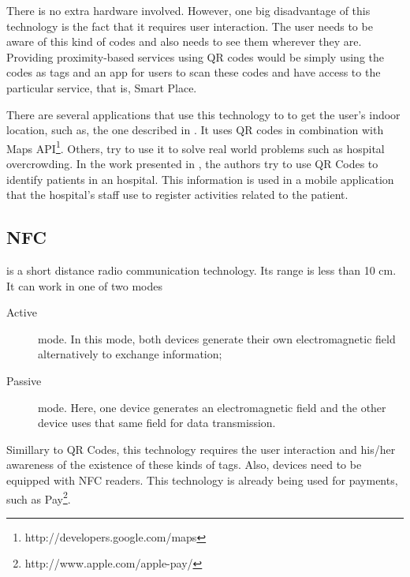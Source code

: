 There is no extra hardware involved.
However, one big disadvantage of this technology is the fact that it requires user interaction.
The user needs to be aware of this kind of codes and also needs to see them wherever they are.
Providing proximity-based services using \gls{QR} codes would be simply using the codes as tags and an app for users to scan these codes and have access to the particular service, that is, Smart Place.

There are several applications that use this technology to to get the user's indoor location, such as, the one described in \cite{qr_indoor}.
It uses \gls{QR} codes in combination with  Maps \gls{API}\footnote{http://developers.google.com/maps}.
Others, try to use it to solve real world problems such as hospital overcrowding.
In the work presented in \cite{qr_hospital}, the authors try to use \gls{QR} Codes to identify patients in an hospital.
This information is used in a mobile application that the hospital's staff use to register activities related to the patient.

\subsection{NFC}
\label{sub:background_near_field _communication}
\cite{nfc} is a short distance radio communication technology.
Its range is less than 10 cm.
It can work in one of two modes
\begin{description}
  \item[Active] mode. In this mode, both devices generate their own electromagnetic field alternatively to exchange information;
  \item[Passive] mode. Here, one device generates an electromagnetic field and the other device uses that same field for data transmission.
\end{description}

Simillary to \gls{QR} Codes, this technology requires the user interaction and his/her awareness of the existence of these kinds of tags.
Also, devices need to be equipped with \gls{NFC} readers.
This technology is already being used for payments, such as  Pay\footnote{http://www.apple.com/apple-pay/}.

